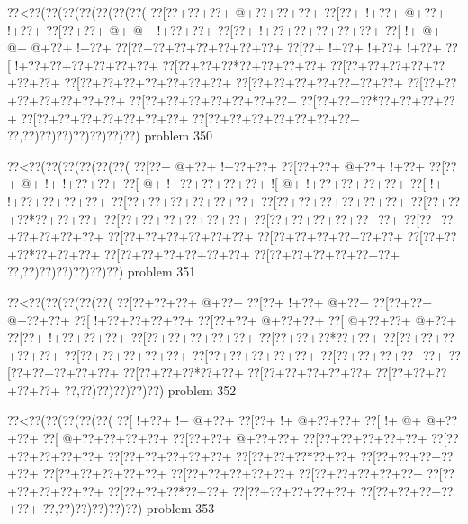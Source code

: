 \vbox{\vbox{\goo
\0??<\0??(\0??(\0??(\0??(\0??(\0??(\0??(
\0??[\0??+\0??+\0??+\- @+\0??+\0??+\0??+
\0??[\0??+\- !+\0??+\- @+\0??+\- !+\0??+
\0??[\0??+\0??+\- @+\- @+\- !+\0??+\0??+
\0??[\0??+\- !+\0??+\0??+\0??+\0??+\0??+
\0??[\- !+\- @+\- @+\- @+\0??+\- !+\0??+
\0??[\0??+\0??+\0??+\0??+\0??+\0??+\0??+
\0??[\0??+\- !+\0??+\- !+\0??+\- !+\0??+
\0??[\- !+\0??+\0??+\0??+\0??+\0??+\0??+
\0??[\0??+\0??+\0??*\0??+\0??+\0??+\0??+
\0??[\0??+\0??+\0??+\0??+\0??+\0??+\0??+
\0??[\0??+\0??+\0??+\0??+\0??+\0??+\0??+
\0??[\0??+\0??+\0??+\0??+\0??+\0??+\0??+
\0??[\0??+\0??+\0??+\0??+\0??+\0??+\0??+
\0??[\0??+\0??+\0??+\0??+\0??+\0??+\0??+
\0??[\0??+\0??+\0??*\0??+\0??+\0??+\0??+
\0??[\0??+\0??+\0??+\0??+\0??+\0??+\0??+
\0??[\0??+\0??+\0??+\0??+\0??+\0??+\0??+
\0??,\0??)\0??)\0??)\0??)\0??)\0??)\0??)
}
\hfil problem 350\hfil\break
}

\vbox{\vbox{\goo
\0??<\0??(\0??(\0??(\0??(\0??(\0??(
\0??[\0??+\- @+\0??+\- !+\0??+\0??+
\0??[\0??+\0??+\- @+\0??+\- !+\0??+
\0??[\0??+\- @+\- !+\- !+\0??+\0??+
\0??[\- @+\- !+\0??+\0??+\0??+\0??+
\- ![\- @+\- !+\0??+\0??+\0??+\0??+
\0??[\- !+\- !+\0??+\0??+\0??+\0??+
\0??[\0??+\0??+\0??+\0??+\0??+\0??+
\0??[\0??+\0??+\0??+\0??+\0??+\0??+
\0??[\0??+\0??+\0??*\0??+\0??+\0??+
\0??[\0??+\0??+\0??+\0??+\0??+\0??+
\0??[\0??+\0??+\0??+\0??+\0??+\0??+
\0??[\0??+\0??+\0??+\0??+\0??+\0??+
\0??[\0??+\0??+\0??+\0??+\0??+\0??+
\0??[\0??+\0??+\0??+\0??+\0??+\0??+
\0??[\0??+\0??+\0??*\0??+\0??+\0??+
\0??[\0??+\0??+\0??+\0??+\0??+\0??+
\0??[\0??+\0??+\0??+\0??+\0??+\0??+
\0??,\0??)\0??)\0??)\0??)\0??)\0??)
}
\hfil problem 351\hfil\break
}

\vbox{\vbox{\goo
\0??<\0??(\0??(\0??(\0??(\0??(
\0??[\0??+\0??+\0??+\- @+\0??+
\0??[\0??+\- !+\0??+\- @+\0??+
\0??[\0??+\0??+\- @+\0??+\0??+
\0??[\- !+\0??+\0??+\0??+\0??+
\0??[\0??+\0??+\- @+\0??+\0??+
\0??[\- @+\0??+\0??+\- @+\0??+
\0??[\0??+\- !+\0??+\0??+\0??+
\0??[\0??+\0??+\0??+\0??+\0??+
\0??[\0??+\0??+\0??*\0??+\0??+
\0??[\0??+\0??+\0??+\0??+\0??+
\0??[\0??+\0??+\0??+\0??+\0??+
\0??[\0??+\0??+\0??+\0??+\0??+
\0??[\0??+\0??+\0??+\0??+\0??+
\0??[\0??+\0??+\0??+\0??+\0??+
\0??[\0??+\0??+\0??*\0??+\0??+
\0??[\0??+\0??+\0??+\0??+\0??+
\0??[\0??+\0??+\0??+\0??+\0??+
\0??,\0??)\0??)\0??)\0??)\0??)
}
\hfil problem 352\hfil\break
}

\vbox{\vbox{\goo
\0??<\0??(\0??(\0??(\0??(\0??(
\0??[\- !+\0??+\- !+\- @+\0??+
\0??[\0??+\- !+\- @+\0??+\0??+
\0??[\- !+\- @+\- @+\0??+\0??+
\0??[\- @+\0??+\0??+\0??+\0??+
\0??[\0??+\0??+\- @+\0??+\0??+
\0??[\0??+\0??+\0??+\0??+\0??+
\0??[\0??+\0??+\0??+\0??+\0??+
\0??[\0??+\0??+\0??+\0??+\0??+
\0??[\0??+\0??+\0??*\0??+\0??+
\0??[\0??+\0??+\0??+\0??+\0??+
\0??[\0??+\0??+\0??+\0??+\0??+
\0??[\0??+\0??+\0??+\0??+\0??+
\0??[\0??+\0??+\0??+\0??+\0??+
\0??[\0??+\0??+\0??+\0??+\0??+
\0??[\0??+\0??+\0??*\0??+\0??+
\0??[\0??+\0??+\0??+\0??+\0??+
\0??[\0??+\0??+\0??+\0??+\0??+
\0??,\0??)\0??)\0??)\0??)\0??)
}
\hfil problem 353\hfil\break
}

